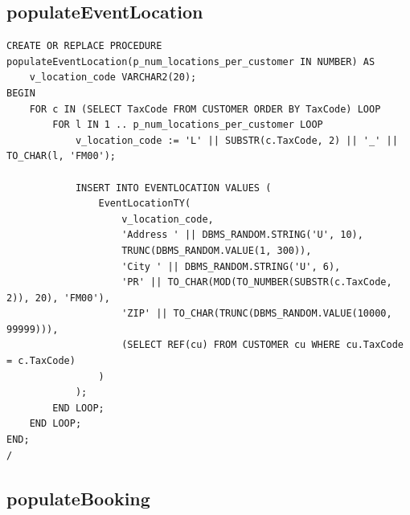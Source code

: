 \subsection*{populateEventLocation}

\begin{lstlisting}
CREATE OR REPLACE PROCEDURE populateEventLocation(p_num_locations_per_customer IN NUMBER) AS
    v_location_code VARCHAR2(20);
BEGIN
    FOR c IN (SELECT TaxCode FROM CUSTOMER ORDER BY TaxCode) LOOP
        FOR l IN 1 .. p_num_locations_per_customer LOOP
            v_location_code := 'L' || SUBSTR(c.TaxCode, 2) || '_' || TO_CHAR(l, 'FM00');

            INSERT INTO EVENTLOCATION VALUES (
                EventLocationTY(
                    v_location_code,
                    'Address ' || DBMS_RANDOM.STRING('U', 10),
                    TRUNC(DBMS_RANDOM.VALUE(1, 300)),
                    'City ' || DBMS_RANDOM.STRING('U', 6),
                    'PR' || TO_CHAR(MOD(TO_NUMBER(SUBSTR(c.TaxCode, 2)), 20), 'FM00'),
                    'ZIP' || TO_CHAR(TRUNC(DBMS_RANDOM.VALUE(10000, 99999))),
                    (SELECT REF(cu) FROM CUSTOMER cu WHERE cu.TaxCode = c.TaxCode)
                )
            );
        END LOOP;
    END LOOP;
END;
/
\end{lstlisting}

\subsection*{populateBooking}

